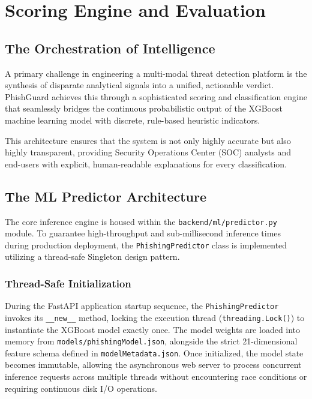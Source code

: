 \chapter{Scoring Engine and Evaluation}
\label{chapter-7-scoring-and-classification}

\section{The Orchestration of
Intelligence}\label{the-orchestration-of-intelligence}

A primary challenge in engineering a multi-modal threat detection
platform is the synthesis of disparate analytical signals into a
unified, actionable verdict. PhishGuard achieves this through a
sophisticated scoring and classification engine that seamlessly bridges
the continuous probabilistic output of the XGBoost machine learning
model with discrete, rule-based heuristic indicators.

This architecture ensures that the system is not only highly accurate
but also highly transparent, providing Security Operations Center (SOC)
analysts and end-users with explicit, human-readable explanations for
every classification.

\section{The ML Predictor
Architecture}\label{the-ml-predictor-architecture}

The core inference engine is housed within the
\texttt{backend/ml/predictor.py} module. To guarantee high-throughput
and sub-millisecond inference times during production deployment, the
\texttt{PhishingPredictor} class is implemented utilizing a thread-safe
Singleton design pattern.

\subsection{Thread-Safe
Initialization}\label{thread-safe-initialization}

During the FastAPI application startup sequence, the
\texttt{PhishingPredictor} invokes its \texttt{\_\_new\_\_} method,
locking the execution thread (\texttt{threading.Lock()}) to instantiate
the XGBoost model exactly once. The model weights are loaded into memory
from \texttt{models/phishingModel.json}, alongside the strict
21-dimensional feature schema defined in \texttt{modelMetadata.json}.
Once initialized, the model state becomes immutable, allowing the
asynchronous web server to process concurrent inference requests across
multiple threads without encountering race conditions or requiring
continuous disk I/O operations.

